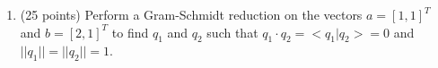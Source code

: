 \documentclass[10pt, a4paper]{article}
\theoremstyle{break}
\begin{document}
\begin{enumerate}


\item (25 points) Perform a Gram-Schmidt reduction on the vectors $a=[1,1]^T$ and $b=[2,1]^T$ to find $q_1$ and $q_2$ such that $q_1 \cdot q_2=<q_1|q_2>=0$ and $||q_1||=||q_2||=1$. 




\end{enumerate}
\end{document}
